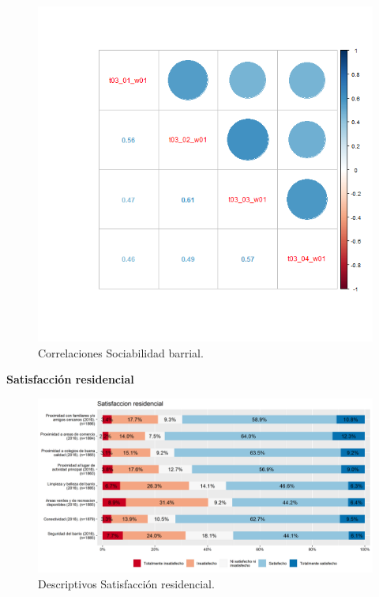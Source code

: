 \documentclass[
  12pt,
]{book}
\begin{document}
\begin{figure}[H]

{\centering \includegraphics[width=1\linewidth,height=1\textheight]{output/graphs/sociabilidad-barrial_cor} 

}

\caption{Correlaciones Sociabilidad barrial.}\label{fig:unnamed-chunk-7}
\end{figure}

\textbf{Satisfacción residencial}

\begin{figure}[H]

{\centering \includegraphics[width=1\linewidth,height=1\textheight]{output/graphs/satisfaccion-residencial} 

}

\caption{Descriptivos Satisfacción residencial.}\label{fig:unnamed-chunk-8}
\end{figure}
\end{document}
